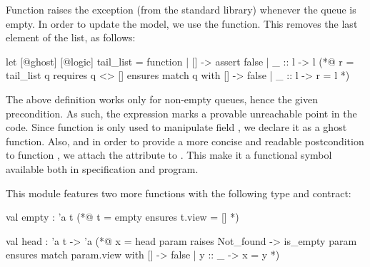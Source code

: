 \documentclass{llncs}
\begin{document}
Function  raises the  exception (from the \ocaml standard
library) whenever the queue is empty. In order to update the  model, we
use the  function. This removes the last element of the 
list, as follows:
%
\begin{gospel}
  let [@ghost] [@logic] tail_list = function
    | [] -> assert false
    | _ :: l -> l
  (*@ r = tail_list q
        requires q <> []
        ensures  match q with [] -> false | _ :: l -> r = l *)
\end{gospel}
%
The above definition works only for non-empty queues, hence the given
precondition. As such, the  expression marks a provable
unreachable point in the code. Since function  is only used to
manipulate field , we declare it as a ghost function. Also, and in
order to provide a more concise and readable postcondition to function
, we attach the \of{[@logic]} attribute to . This make it
a functional symbol available both in specification and program.

This \ocaml module features two more functions with the following type and
contract:
%
\begin{gospel}
  val empty : 'a t
  (*@ t = empty
        ensures t.view = [] *)

  val head : 'a t -> 'a
  (*@ x = head param
        raises  Not_found -> is_empty param
        ensures match param.view with [] -> false | y :: _ -> x = y *)
\end{gospel}
%
\end{document}
